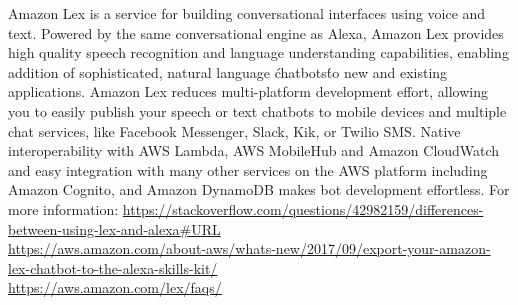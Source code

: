 Amazon Lex is a service for building conversational interfaces using voice and text. Powered by the same conversational engine as Alexa, Amazon Lex provides high quality speech recognition and language understanding capabilities, enabling addition of sophisticated, natural language \'chatbots\' to new and existing applications. Amazon Lex reduces multi-platform development effort, allowing you to easily publish your speech or text chatbots to mobile devices and multiple chat services, like Facebook Messenger, Slack, Kik, or Twilio SMS. Native interoperability with AWS Lambda, AWS MobileHub and Amazon CloudWatch and easy integration with many other services on the AWS platform including Amazon Cognito, and Amazon DynamoDB makes bot development effortless.
For more information: \url{https://stackoverflow.com/questions/42982159/differences-between-using-lex-and-alexa#URL}\\
\url{https://aws.amazon.com/about-aws/whats-new/2017/09/export-your-amazon-lex-chatbot-to-the-alexa-skills-kit/}\\
\url{https://aws.amazon.com/lex/faqs/}



{}
